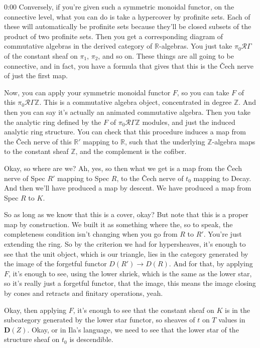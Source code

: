 \begin{unfinished}{0:00}
Conversely, if you're given such a symmetric monoidal functor, on the connective level, what you can do is take a hypercover by profinite sets. Each of these will automatically be profinite sets because they'll be closed subsets of the product of two profinite sets. Then you get a corresponding diagram of commutative algebras in the derived category of $\mathbb{R}$-algebras. You just take $\pi_0 \mathcal{R}\Gamma$ of the constant sheaf on $\pi_1$, $\pi_2$, and so on. These things are all going to be connective, and in fact, you have a formula that gives that this is the Čech nerve of just the first map.

Now, you can apply your symmetric monoidal functor $F$, so you can take $F$ of this $\pi_0 \mathcal{R}\Gamma \mathbb{Z}$. This is a commutative algebra object, concentrated in degree $\mathbb{Z}$. And then you can say it's actually an animated commutative algebra. Then you take the analytic ring defined by the $F$ of $\pi_0 \mathcal{R}\Gamma \mathbb{Z}$ modules, and just the induced analytic ring structure. You can check that this procedure induces a map from the Čech nerve of this $\mathbb{R}'$ mapping to $\mathbb{R}$, such that the underlying $\mathbb{Z}$-algebra maps to the constant sheaf $\mathbb{Z}$, and the complement is the cofiber.

Okay, so where are we? Ah, yes, so then what we get is a map from the Čech nerve of Spec $R'$ mapping to Spec $R$, to the Čech nerve of $t_0$ mapping to Decay. And then we'll have produced a map by descent. We have produced a map from Spec $R$ to $K$. 

So as long as we know that this is a cover, okay? But note that this is a proper map by construction. We built it as something where the, so to speak, the completeness condition isn't changing when you go from $R$ to $R'$. You're just extending the ring. So by the criterion we had for hypersheaves, it's enough to see that the unit object, which is our triangle, lies in the category generated by the image of the forgetful functor $D(R') \to D(R)$. And for that, by applying $F$, it's enough to see, using the lower shriek, which is the same as the lower star, so it's really just a forgetful functor, that the image, this means the image closing by cones and retracts and finitary operations, yeah.

Okay, then applying $F$, it's enough to see that the constant sheaf on $K$ is in the subcategory generated by the lower star functor, so sheaves of $t$ on $T$ values in $\mathbf{D}(Z)$. Okay, or in Ila's language, we need to see that the lower star of the structure sheaf on $t_0$ is descendible.


\end{unfinished}
